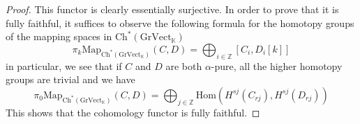 \documentclass[10pt,a4paper]{amsart}
\newcommand{\Hom}{\mathrm{Hom}}
\newcommand{\KK}{\mathbb{K}}
\newcommand{\Vect}{\mathrm{Vect}}
\newcommand{\ch}[1]{\mathrm{Ch^*({#1})}}
\begin{document}
\begin{proof}
This functor is clearly essentially surjective. In order to prove that it is fully faithful, it suffices to observe the following formula for the homotopy groups of the mapping spaces in $\ch{Gr\Vect_\KK}$
\[\pi_k\mathrm{Map}_{\ch{Gr\Vect_\KK}}(C,D)=\bigoplus_{i\in\mathbb{Z}}[C_i,D_i[k]]\]
in particular, we see that if $C$ and $D$ are both $\alpha$-pure, all the higher homotopy groups are trivial and we have 
\[\pi_0\mathrm{Map}_{\ch{Gr\Vect_\KK}}(C,D)=\bigoplus_{j\in\mathbb{Z}}\Hom(H^{sj}(C_{rj}),H^{sj}(D_{rj}))\]
This shows that the cohomology functor is fully faithful.
\end{proof}
\end{document}
